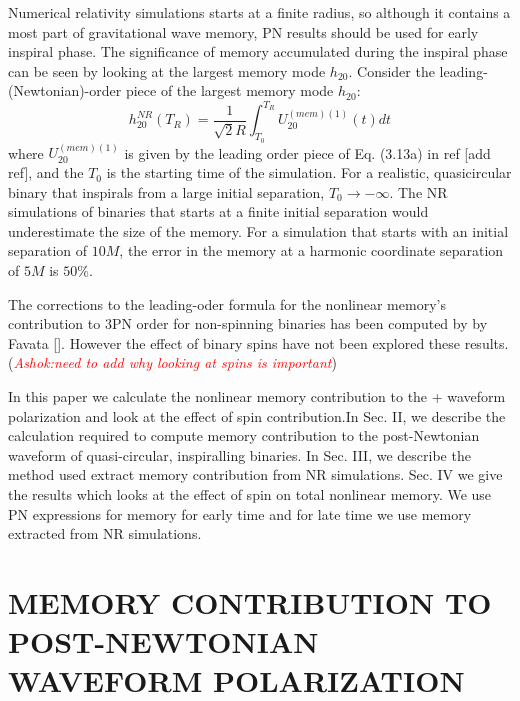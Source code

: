 \documentclass[prd,preprintnumbers,twocolumn,eqsecnum,floatfix,letter]{revtex4}
\newcommand{\ashok}[1]{\textcolor{red}{\textit{Ashok:#1}}}
\begin{document}
Numerical relativity simulations starts at a finite radius, so although it contains a most part of gravitational wave memory, PN results should be used for early inspiral phase. The significance of memory accumulated during the inspiral phase can be seen by looking at the largest memory mode $h_{20}$. Consider the leading-(Newtonian)-order piece of the largest memory mode $h_{20}$:
\begin{equation}
	h^{NR}_{20}\left(T_R\right) = \frac{1}{\sqrt{2}R}\int_{T_0}^{T_R}U^{(mem)(1)}_{20}(t)dt
\end{equation}
where $U^{(mem)(1)}_{20}$ is given by the leading order piece of Eq. (3.13a) in ref [add ref], and the $T_0$ is the starting time of the simulation. For a realistic, quasicircular binary that inspirals from a large initial separation, $T_0 \rightarrow -\infty$. The NR simulations of binaries that starts at a finite initial separation would underestimate the size of the memory. For a simulation that starts with an initial separation of $10M$, the error in the memory at a harmonic coordinate separation of $5M$ is $50\%$. 

\par The corrections to the leading-oder formula for the nonlinear memory's contribution to 3PN order for non-spinning binaries has been computed by by Favata []. However the effect of binary spins have not been explored these results.(\ashok{need to add why looking at spins is important})   



In this paper we calculate the nonlinear memory contribution to the + waveform polarization and look at the effect of spin contribution.In Sec. II, we describe the calculation required to compute memory contribution to the post-Newtonian waveform of quasi-circular, inspiralling binaries. In Sec. III, we describe the method used extract memory contribution from NR simulations. Sec. IV we give the results which looks at the effect of spin on total nonlinear memory. We use PN expressions for memory for early time and for late time we use memory extracted from NR simulations.


\section{MEMORY CONTRIBUTION TO POST-NEWTONIAN WAVEFORM POLARIZATION}
\end{document}
